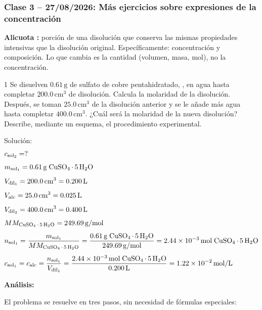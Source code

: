 {}
\subsubsection*{\textcolor{blueunam}{Clase 3 -- 27/08/2026: Más ejercicios sobre expresiones de la concentración}}

\textbf{Alicuota {\color{red}{(alc)}}:} porción de una disolución que conserva las mismas 
propiedades intensivas que la disolución original. Específicamente: concentración 
y composición. Lo que cambia es la cantidad (volumen, masa, mol), no la 
concentración.

\begin{exercise}{1}{}
Se disuelven $0.61\,\mathrm{g}$ de sulfato de cobre pentahidratado, 
, en agua hasta completar $200.0\,\mathrm{cm^3}$ de disolución. 
Calcula la molaridad de la disolución. Después, se toman $25.0\,\mathrm{cm^3}$ 
de la disolución anterior y se le añade más agua hasta completar 
$400.0\,\mathrm{cm^3}$. ¿Cuál será la molaridad de la nueva disolución? 
Describe, mediante un esquema, el procedimiento experimental.

Solución:
\begin{align*}
    &c_{\mathrm{sol_2}} = ? \\[4pt]
    &m_{\mathrm{sol_1}} = 0.61\,\mathrm{g}\;\ce{CuSO4.5H2O} \\[4pt]
    &V_{\mathrm{dil_1}} = 200.0\,\mathrm{cm^3} = 0.200\,\mathrm{L} \\[4pt]
    &V_{\mathrm{alc}} = 25.0\,\mathrm{cm^3} = 0.025\,\mathrm{L} \\[4pt]
    &V_{\mathrm{dil_2}} = 400.0\,\mathrm{cm^3} = 0.400\,\mathrm{L} \\[4pt]
    &MM_{\mathrm{\ce{CuSO4.5H2O}}} = 249.69\,\mathrm{g/mol} \\[4pt]
    &n_{\mathrm{sol_1}} = \frac{m_{\mathrm{sol_1}}}{MM_{\mathrm{\ce{CuSO4.5H2O}}}}
    = \frac{0.61\,\mathrm{g}\;\ce{CuSO4.5H2O}}{249.69\,\mathrm{g/mol}}
    = 2.44\times10^{-3}\,\mathrm{mol}\;\ce{CuSO4.5H2O} \\[4pt]
    &c_{\mathrm{sol_1}} = c_{\mathrm{alc}} = \frac{n_{\mathrm{sol_1}}}{V_{\mathrm{dil_1}}}
    = \frac{2.44\times10^{-3}\,\mathrm{mol}\;\ce{CuSO4.5H2O}}{0.200\,\mathrm{L}}
    = 1.22\times10^{-2}\,\mathrm{mol/L}
\end{align*}

\textbf{Análisis:}

El problema se resuelve en tres pasos, sin necesidad de fórmulas especiales:


\end{exercise}
